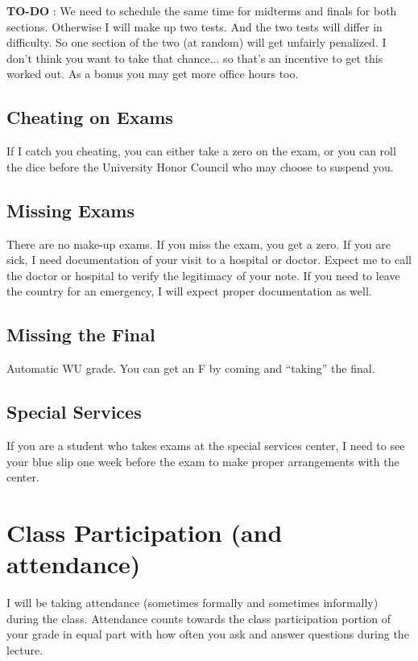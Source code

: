 \documentclass[12pt]{article}
\newcommand{\inred}[1]{\color{red}\textbf{#1} \color{black}}
\newcommand{\qu}[1]{``#1''}
\begin{document}
\inred{TO-DO}: We need to schedule the same time for midterms and finals for both sections. Otherwise I will make up two tests. And the two tests will differ in difficulty. So one section of the two (at random) will get unfairly penalized. I don't think you want to take that chance... so that's an incentive to get this worked out. As a bonus you may get more office hours too.

\subsection*{Cheating on Exams}

If I catch you cheating, you can either take a zero on the exam, or you can roll the dice before the University Honor Council who may choose to suspend you.


\subsection*{Missing Exams}

There are no make-up exams. If you miss the exam, you get a zero. If you are sick, I need documentation of your visit to a hospital or doctor. Expect me to call the doctor or hospital to verify the legitimacy of your note. If you need to leave the country for an emergency, I will expect proper documentation as well.


\subsection*{Missing the Final}

Automatic WU grade. You can get an F by coming and \qu{taking} the final.

\subsection*{Special Services}

If you are a student who takes exams at the special services center, I need to see your blue slip one week before the exam to make proper arrangements with the center.

\section*{Class Participation (and attendance)}

I will be taking attendance (sometimes formally and sometimes informally) during the class. Attendance counts towards the class participation portion of your grade in equal part with how often you ask and answer questions during the lecture.
\end{document}
